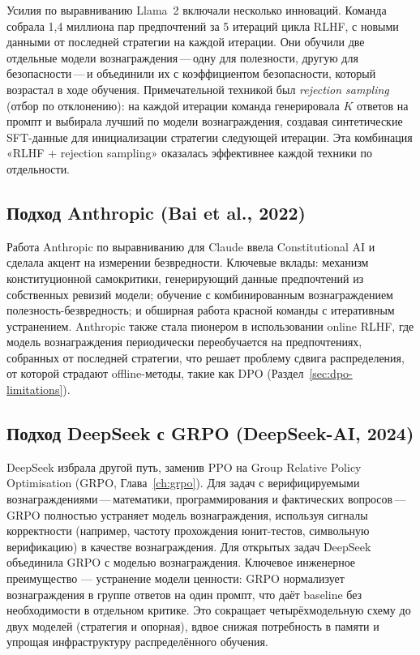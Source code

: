 Усилия по выравниванию Llama~2 включали несколько инноваций. Команда собрала 1,4 миллиона пар предпочтений за 5 итераций цикла RLHF, с новыми данными от последней стратегии на каждой итерации. Они обучили две отдельные модели вознаграждения\,---\,одну для полезности, другую для безопасности\,---\,и объединили их с коэффициентом безопасности, который возрастал в ходе обучения. Примечательной техникой был \emph{rejection sampling} (отбор по отклонению): на каждой итерации команда генерировала $K$ ответов на промпт и выбирала лучший по модели вознаграждения, создавая синтетические SFT-данные для инициализации стратегии следующей итерации. Эта комбинация «RLHF + rejection sampling» оказалась эффективнее каждой техники по отдельности.

\subsection{Подход Anthropic (Bai et al., 2022)}

Работа Anthropic по выравниванию для Claude ввела Constitutional AI и сделала акцент на измерении безвредности. Ключевые вклады: механизм конституционной самокритики, генерирующий данные предпочтений из собственных ревизий модели; обучение с комбинированным вознаграждением полезность-безвредность; и обширная работа красной команды с итеративным устранением. Anthropic также стала пионером в использовании online RLHF, где модель вознаграждения периодически переобучается на предпочтениях, собранных от последней стратегии, что решает проблему сдвига распределения, от которой страдают offline-методы, такие как DPO (Раздел~\ref{sec:dpo-limitations}).

\subsection{Подход DeepSeek с GRPO (DeepSeek-AI, 2024)}

DeepSeek избрала другой путь, заменив PPO на Group Relative Policy Optimisation (GRPO, Глава~\ref{ch:grpo}). Для задач с верифицируемыми вознаграждениями\,---\,математики, программирования и фактических вопросов\,---\,GRPO полностью устраняет модель вознаграждения, используя сигналы корректности (например, частоту прохождения юнит-тестов, символьную верификацию) в качестве вознаграждения. Для открытых задач DeepSeek объединила GRPO с моделью вознаграждения. Ключевое инженерное преимущество --- устранение модели ценности: GRPO нормализует вознаграждения в группе ответов на один промпт, что даёт baseline без необходимости в отдельном критике. Это сокращает четырёхмодельную схему до двух моделей (стратегия и опорная), вдвое снижая потребность в памяти и упрощая инфраструктуру распределённого обучения.

